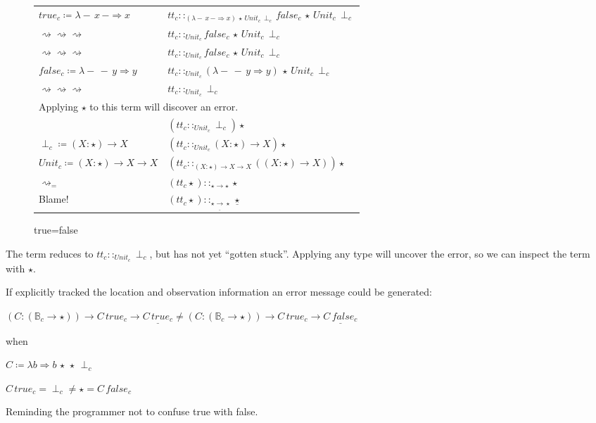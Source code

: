 \begin{sidewaysfigure}
\begin{tabular}{ll}
$true_{c}\coloneqq\lambda-\,x\,-\Rightarrow x$ & $tt_{c}::_{\left(\lambda-\,x\,-\Rightarrow x\right)\,\star\,Unit_{c}\,\perp_{c}}false_{c}\,\star\,Unit_{c}\,\perp_{c}$\tabularnewline

$\rightsquigarrow\rightsquigarrow\rightsquigarrow$ & $tt_{c}::_{Unit_{c}}false_{c}\,\star\,Unit_{c}\,\perp_{c}$\tabularnewline

$\rightsquigarrow\rightsquigarrow\rightsquigarrow$ & $tt_{c}::_{Unit_{c}}false_{c}\,\star\,Unit_{c}\,\perp_{c}$\tabularnewline

$false_{c}\coloneqq\lambda-\,-\,y\Rightarrow y$ & $tt_{c}::_{Unit_{c}}\left(\lambda-\,-\,y \Rightarrow y\right)\,\star\,Unit_{c}\,\perp_{c}$\tabularnewline

$\rightsquigarrow\rightsquigarrow\rightsquigarrow$ & $tt_{c}::_{Unit_{c}}\perp_{c}$\tabularnewline

\multicolumn{2}{l}{Applying $\star$ to this term will discover an error.}\tabularnewline

& $\left(tt_{c}::_{Unit_{c}}\perp_{c}\right)\star$\tabularnewline
$\perp_{c}\coloneqq\left(X:\star\right)\rightarrow X$ & $\left( tt_{c}::_{Unit_{c}}\left(X:\star\right)\rightarrow X\right)  \star$\tabularnewline

$Unit_{c}\coloneqq\left(X:\star\right)\rightarrow X\rightarrow X$ & $\left( tt_{c}::_{\left(X:\star\right)\rightarrow X\rightarrow X}\left(\left(X:\star\right)\rightarrow X\right)\right)  \star$\tabularnewline

$\rightsquigarrow_{=}$ & $\left(tt_{c}\star\right)::_{\star\rightarrow\star}\star$\tabularnewline
Blame! & $\left(tt_{c}\star\right)::_{\star\underline{\rightarrow}\star}\underline{\star}$\tabularnewline

\end{tabular}
\caption{true=false}
\label{fig:cast-ex-tf}
\end{sidewaysfigure}
 

The term reduces to $tt_{c}::_{Unit_{c}}\perp_{c}$, but has not yet ``gotten stuck''.
Applying any type will uncover the error, so we can inspect the term with $\star$.

If  explicitly tracked the location and observation information an error message could be generated:
 
$\left(C:\left(\mathbb{B}_{c}\rightarrow\star\right)\right)\rightarrow C\,true_{c}\rightarrow\underline{C\,true_{c}}
\neq
\left(C:\left(\mathbb{B}_{c}\rightarrow\star\right)\right) \rightarrow C\,true_{c}\rightarrow\underline{C\,false_{c}}$
 
when
 
$C\coloneqq\lambda b \Rightarrow b\,\star\,\star\,\perp_c$
 
$C\, true_c = \perp_c \neq \star = C\, false_c$
 
Reminding the programmer not to confuse true with false.